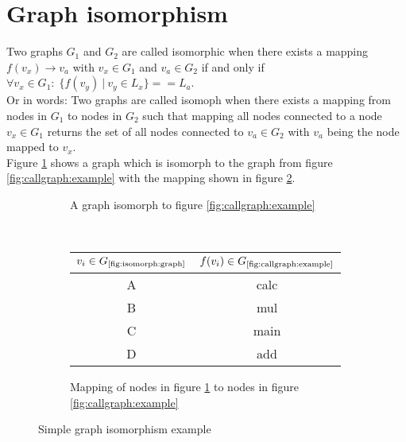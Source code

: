 \documentclass[
    12pt,                               %
    DIV=14,                     %
    parskip=half+,              %
    bigheadings,                %
    cleardoubleempty,   %
    halfparskip,                %
    ]{scrreprt} %
\begin{document}
\section{Graph isomorphism}
Two graphs $G_1$ and $G_2$ are called isomorphic when there exists a mapping $f(v_x) \rightarrow v_a$ with $v_x \in G_1$ and $v_a \in G_2$ if and only if $\forall v_x \in G_1: \; \{f(v_y) \: | \: v_y \in L_x\} == L_a$. \\
Or in words: Two graphs are called isomoph when there exists a mapping from nodes in $G_1$ to nodes in $G_2$ such that mapping all nodes connected to a node $v_x \in G_1$ returns the set of all nodes connected to $v_a \in G_2$ with $v_a$ being the node mapped to $v_x$. \\
Figure \ref{fig:isomorph:graph} shows a graph which is isomorph to the graph from figure \ref{fig:callgraph:example} with the mapping shown in figure \ref{fig:isomorph:mapping}.

\begin{figure}[H]
        \centering
        \begin{subfigure}[b]{0.45\textwidth}
                \centering
                \caption{A graph isomorph to figure \ref{fig:callgraph:example}}
                \label{fig:isomorph:graph}
        \end{subfigure}
        ~
        \begin{subfigure}[b]{0.45\textwidth}
                \centering
				\begin{tabular}{c | c}
					$v_i \in G_{\text{\ref{fig:isomorph:graph}}}$ & $f(v_i) \in G_{\text{\ref{fig:callgraph:example}}}$ \\
					\hline
					A & calc \\
					B & mul \\
					C & main \\
					D & add \\
				\end{tabular}
                \caption{Mapping of nodes in figure \ref{fig:isomorph:graph} to nodes in figure \ref{fig:callgraph:example}}
                \label{fig:isomorph:mapping}
        \end{subfigure}

        \caption{Simple graph isomorphism example}
        \label{fig:isomorph}
\end{figure}
\end{document}
